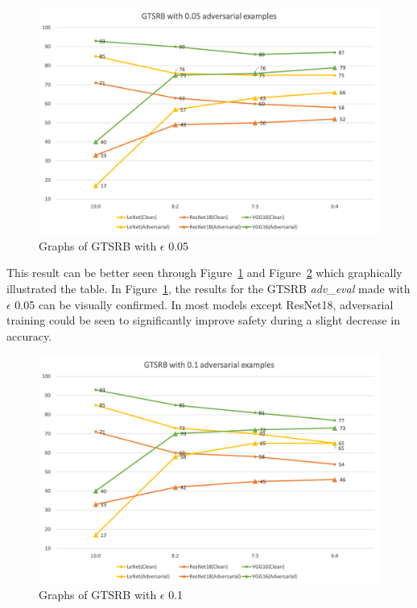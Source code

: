 \documentclass[journal,article,submit,moreauthors,pdftex]{Definitions/mdpi}
\begin{document}
\begin{figure}[H]
    \includegraphics[width=13 cm]{Definitions/graph-005gtsrb.png}
    \caption{Graphs of GTSRB with \begin{math}\epsilon\end{math} 0.05\label{gtsrb-0.05-graph}}
\end{figure} 

This result can be better seen through Figure~\ref{gtsrb-0.05-graph} and Figure~\ref{gtsrb-0.1-graph} which graphically illustrated the table.
In Figure~\ref{gtsrb-0.05-graph}, the results for the GTSRB {\it adv\_eval} made with \begin{math}\epsilon\end{math} 0.05 can be visually confirmed.
In most models except ResNet18, adversarial training could be seen to significantly improve safety during a slight decrease in accuracy.

\begin{figure}[H]
    \includegraphics[width=13 cm]{Definitions/graph-01gtsrb.png}
    \caption{Graphs of GTSRB with \begin{math}\epsilon\end{math} 0.1\label{gtsrb-0.1-graph}}
\end{figure} 
\end{document}
